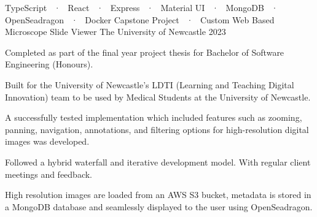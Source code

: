 

\begin{cventries}

  \cventry
  {TypeScript ~·~ React ~·~ Express ~·~ Material UI ~·~ MongoDB ~·~ OpenSeadragon ~·~ Docker } %
  {Capstone Project ~·~ Custom Web Based Microscope Slide Viewer } %
  {The University of Newcastle} %
  {2023} %
  {
    \begin{cvitems} %
      \item {Completed as part of the final year project thesis for Bachelor of Software Engineering (Honours).}
      \item {Built for the University of Newcastle's LDTI (Learning and Teaching Digital Innovation) team to be used by Medical Students at the University of Newcastle.}
      \item {A successfully tested implementation which included features such as zooming, panning, navigation, annotations, and filtering options for high-resolution digital images was developed.}
      \item {Followed a hybrid waterfall and iterative development model. With regular client meetings and feedback.}
      \item {High resolution images are loaded from an AWS S3 bucket, metadata is stored in a MongoDB database and seamlessly displayed to the user using OpenSeadragon.}
    \end{cvitems}
  }



\end{cventries}
